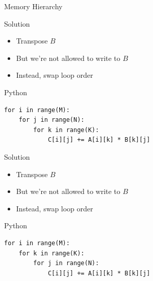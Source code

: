 \documentclass[UKenglish]{beamer}
\begin{document}
\begin{frame}[c, noframenumbering]{Memory Hierarchy}
\begin{center}
    \end{center}
\end{frame}

\begin{frame}[fragile,c]{Solution}
    \begin{itemize}
        \item Transpose $B$
              \pause
        \item But we’re not allowed to write to $B$
              \pause
        \item Instead, swap loop order
    \end{itemize}
    \pause
    \begin{exampleblock}{Python}
        \begin{verbatim}
for i in range(M):
    for j in range(N):
        for k in range(K):
            C[i][j] += A[i][k] * B[k][j]
\end{verbatim}
    \end{exampleblock}
\end{frame}

\begin{frame}{Solution}
    \begin{itemize}
        \item Transpose $B$
        \item But we’re not allowed to write to $B$
        \item Instead, swap loop order
    \end{itemize}
    \begin{exampleblock}{Python}
        \begin{verbatim}
for i in range(M):
    for k in range(K):
        for j in range(N):
            C[i][j] += A[i][k] * B[k][j]
\end{verbatim}
    \end{exampleblock}
\end{frame}
\end{document}
